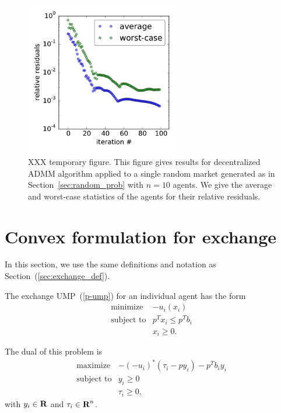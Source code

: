 \documentclass[12pt]{article}
\begin{document}
\begin{figure}
\begin{center}
\includegraphics[width=0.6\textwidth]{figures/admm}
\caption{XXX temporary figure. This figure gives results for decentralized ADMM algorithm applied to a single random market generated as in Section~\ref{sec:random_prob} with $n=10$ agents. We give the average and worst-case statistics of the agents for their relative residuals.}
\end{center}
\label{f-admm}
\end{figure}


\appendix


\section{Convex formulation for exchange}
\label{sec:exchange_proof}
In this section, we use the same definitions and notation as Section~(\ref{sec:exchange_def}).

The exchange UMP~(\ref{p-ump}) for an individual agent has the form
\[
\begin{array}{ll}
\mbox{minimize} & - u_i(x_i)\\
\mbox{subject to} & p^T x_i \leq p^T b_i\\
& x_i \geq 0.
\end{array}
\]

The dual of this problem is
\[
\begin{array}{ll}
\mbox{maximize} & -(- u_i)^*(\tau_i - p y_i) - p^T b_i y_i\\
\mbox{subject to} & y_i \geq 0\\
& \tau_i \geq 0,
\end{array}
\]
with $y_i \in {\mbox{\bf R}}$ and $\tau_i \in {\mbox{\bf R}}^n$.
\end{document}
